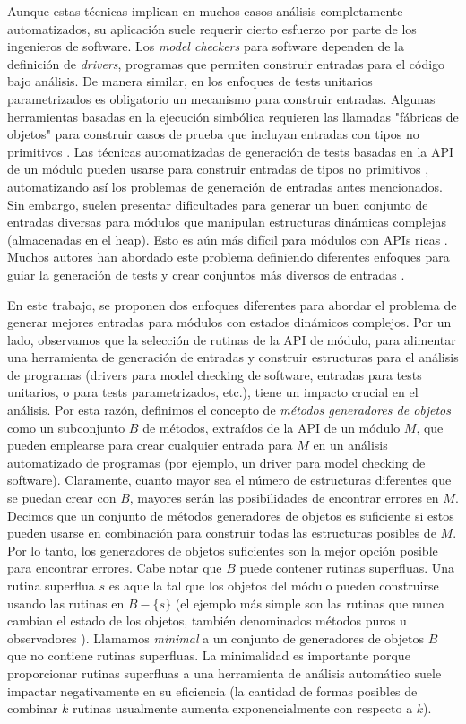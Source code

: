 Aunque estas técnicas implican en muchos casos análisis completamente automatizados, su aplicación suele requerir cierto esfuerzo por parte de los ingenieros de software. Los \emph{model checkers} para software dependen de la definición de \emph{drivers}, programas que permiten construir entradas para el código bajo análisis. De manera similar, en los enfoques de tests unitarios parametrizados \cite{Tillmann:2010} es obligatorio un mecanismo para construir entradas. Algunas herramientas basadas en la ejecución simbólica requieren las llamadas "fábricas de objetos" para construir casos de prueba que incluyan entradas con tipos no primitivos \cite{Tillmann:2008}. Las técnicas automatizadas de generación de tests basadas en la API de un módulo pueden usarse para construir entradas de tipos no primitivos \cite{Pacheco07, Fraser11}, automatizando así los problemas de generación de entradas antes mencionados. Sin embargo, suelen presentar dificultades para generar un buen conjunto de entradas diversas para módulos que manipulan estructuras dinámicas complejas (almacenadas en el heap). Esto es aún más difícil para módulos con APIs ricas \cite{Ponzio:2018}. Muchos autores han abordado este problema definiendo diferentes enfoques para guiar la generación de tests y crear conjuntos más diversos de entradas \cite{Ponzio:2018, Ciupa:2008}.

En este trabajo, se proponen dos enfoques diferentes para abordar el problema de generar mejores entradas para módulos con estados dinámicos complejos. Por un lado, observamos que la selección de rutinas de la API de módulo, para alimentar una herramienta de generación de entradas y construir estructuras para el análisis de programas (drivers para model checking de software, entradas para tests unitarios, o para tests parametrizados, etc.), tiene un impacto crucial en el análisis. Por esta razón, definimos el concepto de \emph{métodos generadores de objetos} como un subconjunto \(B\) de métodos, extraídos de la API de un módulo \(M\), que pueden emplearse para crear cualquier entrada para \(M\) en un análisis automatizado de programas  (por ejemplo, un driver para model checking de software). 
Claramente, cuanto mayor sea el número de estructuras diferentes que se puedan crear con \(B\), mayores serán las posibilidades de encontrar errores en \(M\). Decimos que un conjunto de métodos generadores de objetos es suficiente si estos pueden usarse en combinación para construir todas las estructuras posibles de \(M\). Por lo tanto, los generadores de objetos suficientes son la mejor opción posible para encontrar errores. Cabe notar que \(B\) puede contener rutinas superfluas. Una rutina superflua \(s\) es aquella tal que los objetos del módulo pueden construirse usando las rutinas en $B - \{s\}$ (el ejemplo más simple son las rutinas que nunca cambian el estado de los objetos, también denominados métodos puros u observadores \cite{}). Llamamos \emph{minimal} a un conjunto de generadores de objetos \(B\) que no contiene rutinas superfluas. La minimalidad es importante porque proporcionar rutinas superfluas a una herramienta de análisis automático suele impactar negativamente en su eficiencia (la cantidad de formas posibles de combinar \(k\) rutinas usualmente aumenta exponencialmente con respecto a \(k\)). 

